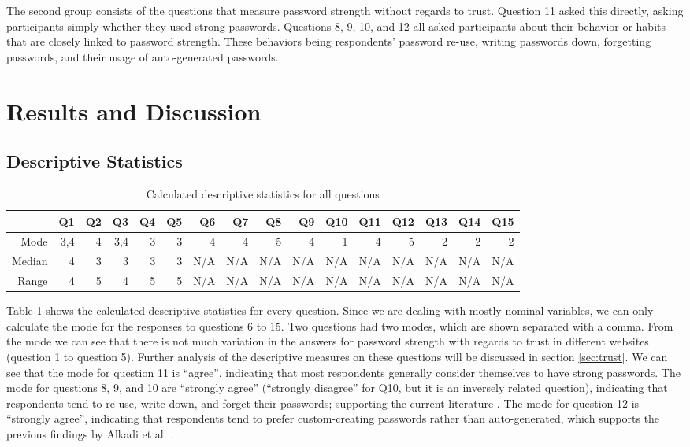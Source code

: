 \documentclass[letterpaper, 10 pt, conference]{ieeeconf}  %
\begin{document}
The second group consists of the questions that measure password strength without regards to trust. Question 11 asked this directly, asking participants simply whether they used strong passwords. Questions 8, 9, 10, and 12 all asked participants about their behavior or habits that are closely linked to password strength. These behaviors being respondents' password re-use, writing passwords down, forgetting passwords, and their usage of auto-generated passwords.

\section{Results and Discussion}\label{sec:results}

\subsection{Descriptive Statistics}

\begin{table}[h]
\caption{Calculated descriptive statistics for all questions}
\label{tab:desc}
\begin{center}
\begin{tabular}{rrrrrrrrrrrrrrrr}
\hline
      & Q1  & Q2 & Q3  & Q4 & Q5 & Q6  & Q7  & Q8  & Q9  & Q10 & Q11 & Q12 & Q13 & Q14 & Q15 \\ \hline
Mode   & 3,4 & 4  & 3,4 & 3  & 3  & 4   & 4   & 5   & 4   & 1   & 4   & 5   & 2   & 2   & 2   \\ \hline
Median & 4   & 3  & 3   & 3  & 3  & N/A & N/A & N/A & N/A & N/A & N/A & N/A & N/A & N/A & N/A \\ \hline
Range  & 4   & 5  & 4   & 5  & 5  & N/A & N/A & N/A & N/A & N/A & N/A & N/A & N/A & N/A & N/A \\ \hline
\end{tabular}
\end{center}
\end{table}

Table \ref{tab:desc} shows the calculated descriptive statistics for every question. Since we are dealing with mostly nominal variables, we can only calculate the mode for the responses to questions 6 to 15.  Two questions had two modes, which are shown separated with a comma. From the mode we can see that there is not much variation in the answers for password strength with regards to trust in different websites (question 1 to question 5). Further analysis of the descriptive measures on these questions will be discussed in section \ref{sec:trust}. We can see that the mode for question 11 is “agree”, indicating that most respondents generally consider themselves to have strong passwords. The mode for questions 8, 9, and 10 are “strongly agree” (“strongly disagree” for Q10, but it is an inversely related question), indicating that respondents tend to re-use, write-down, and forget their passwords; supporting the current literature \cite{Brown2004}. The mode for question 12 is “strongly agree”, indicating that respondents tend to prefer custom-creating passwords rather than auto-generated, which supports the previous findings by Alkadi et al. \cite{Alkadi2016}.
\end{document}
